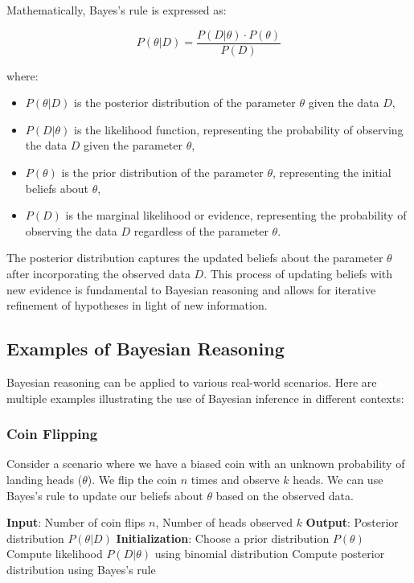 \documentclass[12pt]{book} %
\begin{document}
Mathematically, Bayes's rule is expressed as:

\[
P(\theta | D) = \frac{P(D | \theta) \cdot P(\theta)}{P(D)}
\]

where:
\begin{itemize}
    \item \(P(\theta | D)\) is the posterior distribution of the parameter \(\theta\) given the data \(D\),
    \item \(P(D | \theta)\) is the likelihood function, representing the probability of observing the data \(D\) given the parameter \(\theta\),
    \item \(P(\theta)\) is the prior distribution of the parameter \(\theta\), representing the initial beliefs about \(\theta\),
    \item \(P(D)\) is the marginal likelihood or evidence, representing the probability of observing the data \(D\) regardless of the parameter \(\theta\).
\end{itemize}

The posterior distribution captures the updated beliefs about the parameter \(\theta\) after incorporating the observed data \(D\). This process of updating beliefs with new evidence is fundamental to Bayesian reasoning and allows for iterative refinement of hypotheses in light of new information.

\subsection{Examples of Bayesian Reasoning}

Bayesian reasoning can be applied to various real-world scenarios. Here are multiple examples illustrating the use of Bayesian inference in different contexts:

\subsubsection{Coin Flipping}

Consider a scenario where we have a biased coin with an unknown probability of landing heads (\(\theta\)). We flip the coin \(n\) times and observe \(k\) heads. We can use Bayes's rule to update our beliefs about \(\theta\) based on the observed data.

\FloatBarrier
\begin{algorithm}
\caption{Bayesian Inference for Coin Flipping}
\begin{algorithmic}[1]
\State \textbf{Input}: Number of coin flips \(n\), Number of heads observed \(k\)
\State \textbf{Output}: Posterior distribution \(P(\theta | D)\)
\State \textbf{Initialization}: Choose a prior distribution \(P(\theta)\)
\State Compute likelihood \(P(D | \theta)\) using binomial distribution
\State Compute posterior distribution using Bayes's rule
\end{algorithmic}
\end{algorithm}
\FloatBarrier
\end{document}
